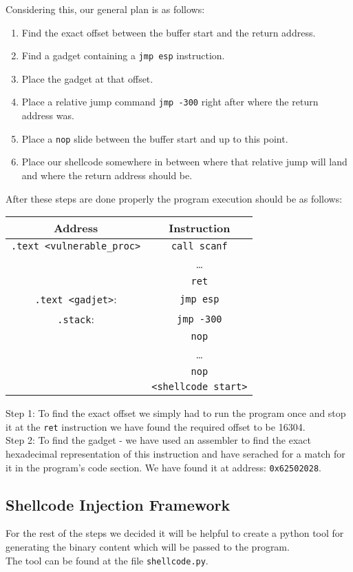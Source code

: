 \documentclass{article}
\begin{document}
Considering this, our general plan is as follows:
\begin{enumerate}
    \item Find the exact offset between the buffer start and the return address.
    \item Find a gadget containing a \texttt{jmp esp} instruction.
    \item Place the gadget at that offset.
    \item Place a relative jump command \texttt{jmp -300} right after where the return address was.
    \item Place a \texttt{nop} slide between the buffer start and up to this point.
    \item Place our shellcode somewhere in between where that relative jump will land and
        where the return address should be.
\end{enumerate}
After these steps are done properly 
the program execution should be as follows:
\begin{center}
    \begin{tabular}{|c|c|}
        \hline
        \textbf{Address} & \textbf{Instruction}\\
        \hline
        \texttt{.text <vulnerable\_proc>} & \texttt{call scanf}\\
        & \dots\\
        & \texttt{ret}\\
        \hline
        \texttt{.text <gadjet>}: & \texttt{jmp esp}\\
        \hline
        \texttt{.stack}: & \texttt{jmp -300}\\
        & \texttt{nop}\\
        & \dots\\
        & \texttt{nop}\\
        & \texttt{<shellcode start>}\\
        \hline
    \end{tabular}
\end{center}
Step 1: To find the exact offset we simply had to run the program once and
stop it at the \texttt{ret} instruction we have found the required offset to be 16304.\\
Step 2: To find the gadget - we have used an assembler to find the exact hexadecimal representation
of this instruction and have serached for a match for it in the program's code section.
We have found it at address: \texttt{0x62502028}.\\

\subsection{Shellcode Injection Framework}
For the rest of the steps we decided it will be helpful to create a
python tool for generating the binary content which will be passed to the program.\\
The tool can be found at the file \texttt{shellcode.py}.\\
\end{document}
